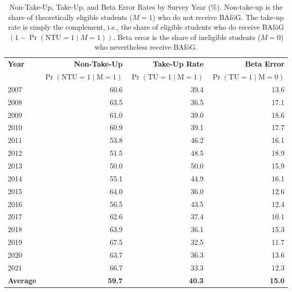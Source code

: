 \begin{table}[htbp]
\small
\centering
\begin{tabular}{l@{\hspace{2em}}r@{\hspace{2em}}r@{\hspace{2em}}r}
\toprule
\textbf{Year} & \textbf{Non-Take-Up} & \textbf{Take-Up Rate} & \textbf{Beta Error} \\
              & \(\Pr(\text{NTU} = 1 \mid \text{M} = 1)\) & \(\Pr(\text{TU} = 1 \mid \text{M} = 1)\) & \(\Pr(\text{TU} = 1 \mid \text{M} = 0)\) \\
\midrule
2007 & 60.6 & 39.4 & 13.6 \\
2008 & 63.5 & 36.5 & 17.1 \\
2009 & 61.0 & 39.0 & 18.6 \\
2010 & 60.9 & 39.1 & 17.7 \\
2011 & 53.8 & 46.2 & 16.1 \\
2012 & 51.5 & 48.5 & 18.9 \\
2013 & 50.0 & 50.0 & 15.9 \\
2014 & 55.1 & 44.9 & 16.1 \\
2015 & 64.0 & 36.0 & 12.6 \\
2016 & 56.5 & 43.5 & 12.4 \\
2017 & 62.6 & 37.4 & 10.1 \\
2018 & 63.9 & 36.1 & 15.3 \\
2019 & 67.5 & 32.5 & 11.7 \\
2020 & 63.7 & 36.3 & 13.6 \\
2021 & 66.7 & 33.3 & 12.3 \\
\midrule
\textbf{Average} & \textbf{59.7} & \textbf{40.3} & \textbf{15.0} \\
\bottomrule
\end{tabular}
\caption{\small{Non-Take-Up, Take-Up, and Beta Error Rates by Survey Year (\%). Non-take-up is the share of theoretically eligible students (\(M=1\)) who do not receive BAföG. The take-up rate is simply the complement, i.e., the share of eligible students who do receive BAföG \((1 - \Pr(\text{NTU} = 1 \mid M = 1))\). Beta error is the share of ineligible students (\(M=0\)) who nevertheless receive BAföG.}}
\label{table:microsimulation_ntu}
\end{table}
